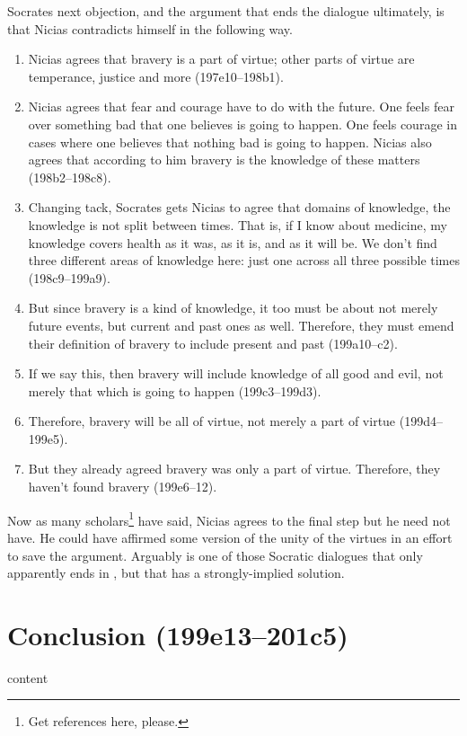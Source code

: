 \documentclass[11pt]{article}
\begin{document}
Socrates next objection, and the argument that ends the dialogue ultimately, is that Nicias contradicts himself in the following way.

\begin{enumerate}
    \item Nicias agrees that bravery is a part of virtue; other parts of virtue are temperance, justice and more (197e10--198b1).
    \item Nicias agrees that fear and courage have to do with the future.  One feels fear over something bad that one believes is going to happen.  One feels courage in cases where one believes that nothing bad is going to happen.  Nicias also agrees that according to him bravery is the knowledge of these matters (198b2--198c8).
    \item Changing tack, Socrates gets Nicias to agree that domains of knowledge, the knowledge is not split between times.  That is, if I know about medicine, my knowledge covers health as it was, as it is, and as it will be.  We don't find three different areas of knowledge here: just one across all three possible times (198c9--199a9).
    \item But since bravery is a kind of knowledge, it too must be about not merely future events, but current and past ones as well. Therefore, they must emend their definition of bravery to include present and past (199a10--c2).
    \item If we say this, then bravery will include knowledge of all good and evil, not merely that which is going to happen (199c3--199d3).
    \item Therefore, bravery will be all of virtue, not merely a part of virtue (199d4--199e5).
    \item But they already agreed bravery was only a part of virtue.  Therefore, they haven't found bravery (199e6--12).
\end{enumerate}

Now as many scholars\footnote{Get references here, please.} have said, Nicias agrees to the final step but he need not have.  He could have affirmed some version of the unity of the virtues in an effort to save the argument.  Arguably  is one of those Socratic dialogues that only apparently ends in , but that has a strongly-implied solution.




\section{Conclusion (199e13--201c5)}

content


\newpage


\end{document}
